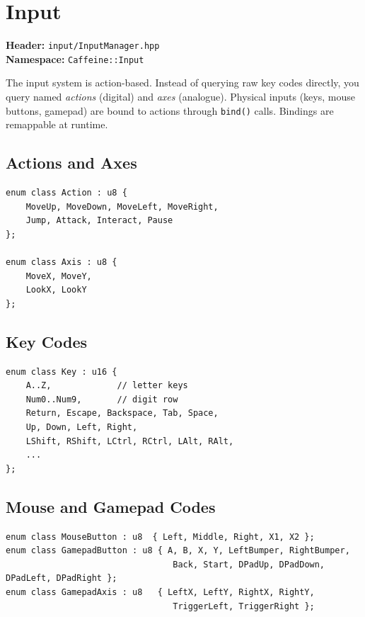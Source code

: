 \chapter{Input}

\textbf{Header:} \texttt{input/InputManager.hpp}\\
\textbf{Namespace:} \texttt{Caffeine::Input}

The input system is action-based. Instead of querying raw key codes directly,
you query named \emph{actions} (digital) and \emph{axes} (analogue). Physical
inputs (keys, mouse buttons, gamepad) are bound to actions through
\texttt{bind()} calls. Bindings are remappable at runtime.

\section{Actions and Axes}

\begin{lstlisting}
enum class Action : u8 {
    MoveUp, MoveDown, MoveLeft, MoveRight,
    Jump, Attack, Interact, Pause
};

enum class Axis : u8 {
    MoveX, MoveY,
    LookX, LookY
};
\end{lstlisting}

\section{Key Codes}

\begin{lstlisting}
enum class Key : u16 {
    A..Z,             // letter keys
    Num0..Num9,       // digit row
    Return, Escape, Backspace, Tab, Space,
    Up, Down, Left, Right,
    LShift, RShift, LCtrl, RCtrl, LAlt, RAlt,
    ...
};
\end{lstlisting}

\section{Mouse and Gamepad Codes}

\begin{lstlisting}
enum class MouseButton : u8  { Left, Middle, Right, X1, X2 };
enum class GamepadButton : u8 { A, B, X, Y, LeftBumper, RightBumper,
                                 Back, Start, DPadUp, DPadDown, DPadLeft, DPadRight };
enum class GamepadAxis : u8   { LeftX, LeftY, RightX, RightY,
                                 TriggerLeft, TriggerRight };
\end{lstlisting}

